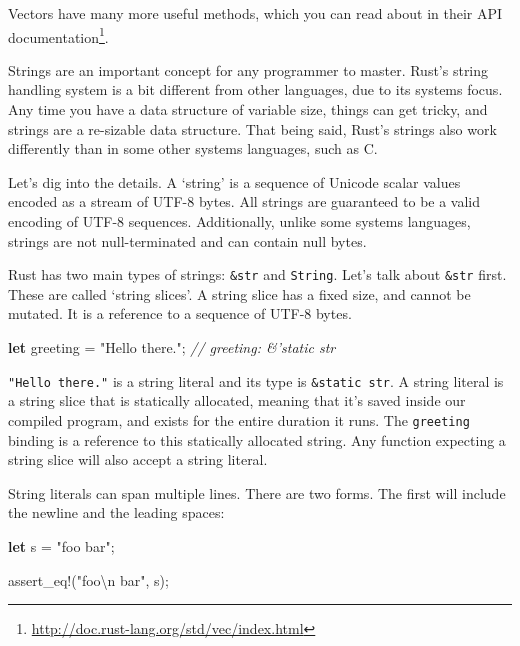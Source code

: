 \documentclass[a4paper,]{book}
\newenvironment{Shaded}{\begin{snugshade}}{\end{snugshade}}
\newcommand{\KeywordTok}[1]{\textcolor[rgb]{0.13,0.29,0.53}{\textbf{{#1}}}}
\newcommand{\CharTok}[1]{\textcolor[rgb]{0.31,0.60,0.02}{{#1}}}
\newcommand{\StringTok}[1]{\textcolor[rgb]{0.31,0.60,0.02}{{#1}}}
\newcommand{\CommentTok}[1]{\textcolor[rgb]{0.56,0.35,0.01}{\textit{{#1}}}}
\newcommand{\OtherTok}[1]{\textcolor[rgb]{0.56,0.35,0.01}{{#1}}}
\newcommand{\NormalTok}[1]{{#1}}
\renewcommand{\href}[2]{#2\footnote{\url{#1}}}
\begin{document}
Vectors have many more useful methods, which you can read about in
\href{http://doc.rust-lang.org/std/vec/index.html}{their API
documentation}.


Strings are an important concept for any programmer to master. Rust's
string handling system is a bit different from other languages, due to
its systems focus. Any time you have a data structure of variable size,
things can get tricky, and strings are a re-sizable data structure. That
being said, Rust's strings also work differently than in some other
systems languages, such as C.

Let's dig into the details. A `string' is a sequence of Unicode scalar
values encoded as a stream of UTF-8 bytes. All strings are guaranteed to
be a valid encoding of UTF-8 sequences. Additionally, unlike some
systems languages, strings are not null-terminated and can contain null
bytes.

Rust has two main types of strings: \texttt{\&str} and \texttt{String}.
Let's talk about \texttt{\&str} first. These are called `string slices'.
A string slice has a fixed size, and cannot be mutated. It is a
reference to a sequence of UTF-8 bytes.

\begin{Shaded}
\begin{Highlighting}[]
\KeywordTok{let} \NormalTok{greeting = }\StringTok{"Hello there."}\NormalTok{; }\CommentTok{// greeting: &'static str}
\end{Highlighting}
\end{Shaded}

\texttt{"Hello\ there."} is a string literal and its type is
\texttt{\&\textquotesingle{}static\ str}. A string literal is a string
slice that is statically allocated, meaning that it's saved inside our
compiled program, and exists for the entire duration it runs. The
\texttt{greeting} binding is a reference to this statically allocated
string. Any function expecting a string slice will also accept a string
literal.

String literals can span multiple lines. There are two forms. The first
will include the newline and the leading spaces:

\begin{Shaded}
\begin{Highlighting}[]
\KeywordTok{let} \NormalTok{s = }\StringTok{"foo}
\StringTok{    bar"}\NormalTok{;}

\OtherTok{assert_eq!}\NormalTok{(}\StringTok{"foo}\CharTok{\textbackslash{}n}\StringTok{        bar"}\NormalTok{, s);}
\end{Highlighting}
\end{Shaded}
\end{document}
